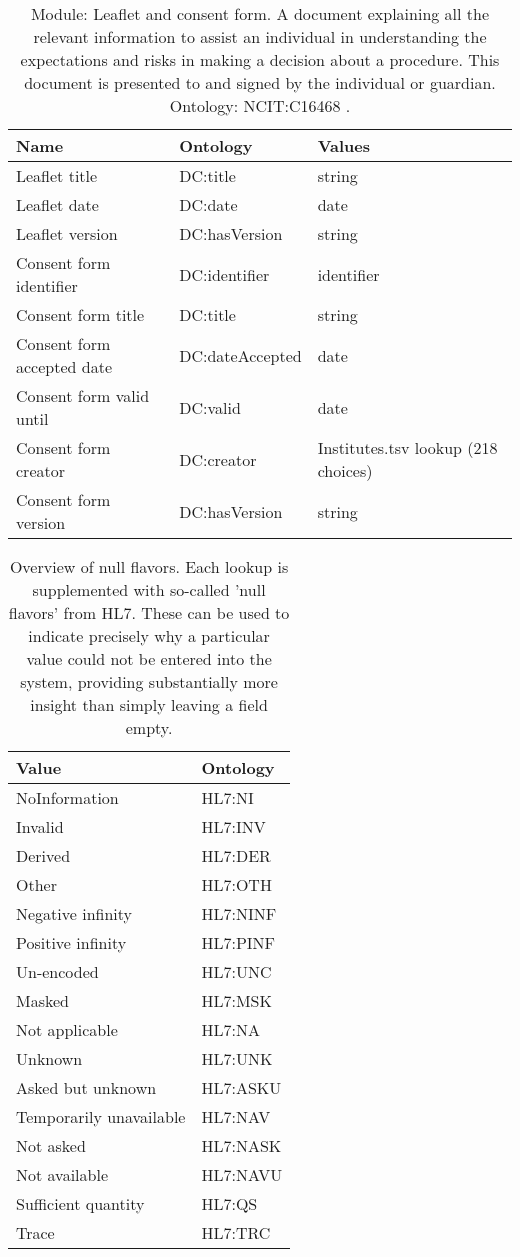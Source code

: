\documentclass{article}
\begin{document}
\begin{table}[htb]
\begin{tabular}{lll}
Name & Ontology & Values \\
\hline
Leaflet title & DC:title  & string \\
Leaflet date & DC:date  & date \\
Leaflet version & DC:hasVersion  & string \\
Consent form identifier & DC:identifier  & identifier \\
Consent form title & DC:title  & string \\
Consent form accepted date & DC:dateAccepted  & date \\
Consent form valid until & DC:valid  & date \\
Consent form creator & DC:creator  & Institutes.tsv lookup (218 choices) \\
Consent form version & DC:hasVersion  & string \\
\hline
\end{tabular}
\caption[Module: Leaflet and consent form]{\label{table:table14} Module: Leaflet and consent form. A document explaining all the relevant information to assist an individual in understanding the expectations and risks in making a decision about a procedure. This document is presented to and signed by the individual or guardian. Ontology: NCIT:C16468 . }
\end{table}

\begin{table}[htb]
\begin{tabular}{ll}
Value & Ontology \\
\hline
NoInformation & HL7:NI \\
Invalid & HL7:INV \\
Derived & HL7:DER \\
Other & HL7:OTH \\
Negative infinity & HL7:NINF \\
Positive infinity & HL7:PINF \\
Un-encoded & HL7:UNC \\
Masked & HL7:MSK \\
Not applicable & HL7:NA \\
Unknown & HL7:UNK \\
Asked but unknown & HL7:ASKU \\
Temporarily unavailable & HL7:NAV \\
Not asked & HL7:NASK \\
Not available & HL7:NAVU \\
Sufficient quantity & HL7:QS \\
Trace & HL7:TRC \\
\hline
\end{tabular}
\caption[NullFlavors]{\label{table:table15} Overview of null flavors. Each lookup is supplemented with so-called 'null flavors' from HL7. These can be used to indicate precisely why a particular value could not be entered into the system, providing substantially more insight than simply leaving a field empty. }
\end{table}
\end{document}
